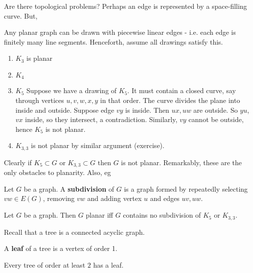 \documentclass{article}
\begin{document}
Are there topological problems? Perhaps an edge is represented by a space-filling curve.
But,
\begin{fact}
    Any planar graph can be drawn with piecewise linear edges - i.e. each edge is finitely many line segments.
    Henceforth, assume all drawings satisfy this.
\end{fact}

\begin{eg}
    \leavevmode
    \begin{enumerate}[label=\arabic*.]
        \item $K_3$ is planar %
        \item $K_4$ %
        \item $K_5$ %
            Suppose we have a drawing of $K_5$. It must contain a closed curve, say through vertices $u, v, w, x, y$ in that order.
            The curve divides the plane into inside and outside.
            Suppose edge $vy$ is inside. Then $ux, uw$ are outside.
            So $yu$, $vx$ inside, so they intersect, a contradiction.
            Similarly, $vy$ cannot be outside, hence $K_5$ is not planar.
        \item $K_{3,3}$ is not planar by similar argument (exercise).
    \end{enumerate}
\end{eg}

Clearly if $K_5 \subset G$ or $K_{3,3} \subset G$ then $G$ is not planar.
Remarkably, these are the only obstacles to planarity.
Also, eg

\begin{defi}[Subdivision]
    Let $G$ be a graph. A \textbf{subdivision} of $G$ is a graph formed by repeatedly selecting $vw \in E(G)$, removing $vw$ and adding vertex $u$ and edges $uv, uw$.
\end{defi}

\begin{nthm}\label{thm:19}
    Let $G$ be a graph. Then $G$ planar iff $G$ contains no subdivision of $K_5$ or $K_{3,3}$.
\end{nthm}

Recall that a tree is a connected acyclic graph.
\begin{defi}
    A \textbf{leaf} of a tree is a vertex of order 1.
\end{defi}

\begin{nprop}\label{prop:20}
    Every tree of order at least $2$ has a leaf.
\end{nprop}
\end{document}
